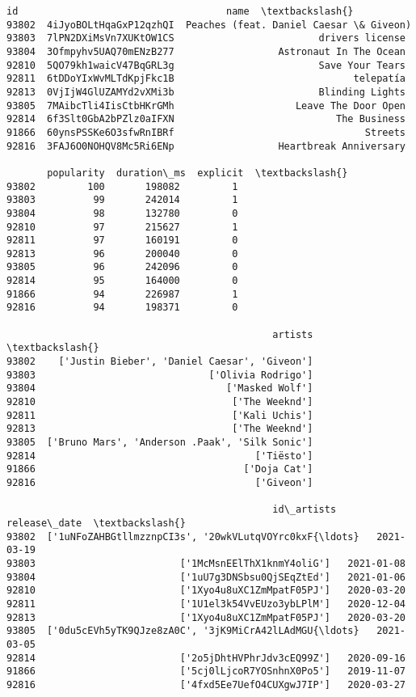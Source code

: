 \documentclass[11pt]{article}
\makeatletter
\newcommand{\boxspacing}{\kern\kvtcb@left@rule\kern\kvtcb@boxsep}
\newcommand{\prompt}[4]{
        {\ttfamily\llap{{\color{#2}[#3]:\hspace{3pt}#4}}\vspace{-\baselineskip}}
    }
\makeatother
\begin{document}
            \begin{tcolorbox}[breakable, size=fbox, boxrule=.5pt, pad at break*=1mm, opacityfill=0]
\prompt{Out}{outcolor}{11}{\boxspacing}
\begin{Verbatim}[commandchars=\\\{\}]
                           id                                    name  \textbackslash{}
93802  4iJyoBOLtHqaGxP12qzhQI  Peaches (feat. Daniel Caesar \& Giveon)
93803  7lPN2DXiMsVn7XUKtOW1CS                         drivers license
93804  3Ofmpyhv5UAQ70mENzB277                  Astronaut In The Ocean
92810  5QO79kh1waicV47BqGRL3g                         Save Your Tears
92811  6tDDoYIxWvMLTdKpjFkc1B                               telepatía
92813  0VjIjW4GlUZAMYd2vXMi3b                         Blinding Lights
93805  7MAibcTli4IisCtbHKrGMh                     Leave The Door Open
92814  6f3Slt0GbA2bPZlz0aIFXN                            The Business
91866  60ynsPSSKe6O3sfwRnIBRf                                 Streets
92816  3FAJ6O0NOHQV8Mc5Ri6ENp                  Heartbreak Anniversary

       popularity  duration\_ms  explicit  \textbackslash{}
93802         100       198082         1
93803          99       242014         1
93804          98       132780         0
92810          97       215627         1
92811          97       160191         0
92813          96       200040         0
93805          96       242096         0
92814          95       164000         0
91866          94       226987         1
92816          94       198371         0

                                              artists  \textbackslash{}
93802    ['Justin Bieber', 'Daniel Caesar', 'Giveon']
93803                              ['Olivia Rodrigo']
93804                                 ['Masked Wolf']
92810                                  ['The Weeknd']
92811                                  ['Kali Uchis']
92813                                  ['The Weeknd']
93805  ['Bruno Mars', 'Anderson .Paak', 'Silk Sonic']
92814                                      ['Tiësto']
91866                                    ['Doja Cat']
92816                                      ['Giveon']

                                              id\_artists release\_date  \textbackslash{}
93802  ['1uNFoZAHBGtllmzznpCI3s', '20wkVLutqVOYrc0kxF{\ldots}   2021-03-19
93803                         ['1McMsnEElThX1knmY4oliG']   2021-01-08
93804                         ['1uU7g3DNSbsu0QjSEqZtEd']   2021-01-06
92810                         ['1Xyo4u8uXC1ZmMpatF05PJ']   2020-03-20
92811                         ['1U1el3k54VvEUzo3ybLPlM']   2020-12-04
92813                         ['1Xyo4u8uXC1ZmMpatF05PJ']   2020-03-20
93805  ['0du5cEVh5yTK9QJze8zA0C', '3jK9MiCrA42lLAdMGU{\ldots}   2021-03-05
92814                         ['2o5jDhtHVPhrJdv3cEQ99Z']   2020-09-16
91866                         ['5cj0lLjcoR7YOSnhnX0Po5']   2019-11-07
92816                         ['4fxd5Ee7UefO4CUXgwJ7IP']   2020-03-27


\end{Verbatim}
\end{tcolorbox}
\end{document}
